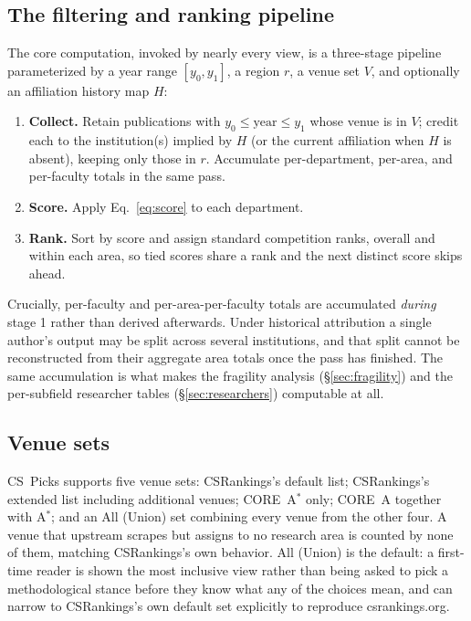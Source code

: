 \documentclass[11pt]{article}
\newcommand{\sys}{CS~Picks}
\newcommand{\csr}{CSRankings}
\begin{document}
\subsection{The filtering and ranking pipeline}

The core computation, invoked by nearly every view, is a three-stage pipeline
parameterized by a year range $[y_0, y_1]$, a region $r$, a venue set $V$, and
optionally an affiliation history map $H$:

\begin{enumerate}
  \item \textbf{Collect.} Retain publications with $y_0 \le \text{year} \le
    y_1$ whose venue is in $V$; credit each to the institution(s) implied by
    $H$ (or the current affiliation when $H$ is absent), keeping only those in
    $r$. Accumulate per-department, per-area, and per-faculty totals in the
    same pass.
  \item \textbf{Score.} Apply Eq.~\ref{eq:score} to each department.
  \item \textbf{Rank.} Sort by score and assign standard competition ranks,
    overall and within each area, so tied scores share a rank and the next
    distinct score skips ahead.
\end{enumerate}

Crucially, per-faculty and per-area-per-faculty totals are accumulated
\emph{during} stage 1 rather than derived afterwards. Under historical
attribution a single author's output may be split across several institutions,
and that split cannot be reconstructed from their aggregate area totals once
the pass has finished. The same accumulation is what makes the fragility
analysis (\S\ref{sec:fragility}) and the per-subfield researcher tables
(\S\ref{sec:researchers}) computable at all.

\subsection{Venue sets}
\label{sec:venuesets}

\sys{} supports five venue sets: \csr{}'s default list; \csr{}'s extended list
including additional venues; CORE~A$^*$ only; CORE~A together with A$^*$; and
an All (Union) set combining every venue from the other four. A venue that
upstream scrapes but assigns to no research area is counted by none of them,
matching \csr{}'s own behavior. All (Union) is the default: a first-time
reader is shown the most inclusive view rather than being asked to pick a
methodological stance before they know what any of the choices mean, and can
narrow to \csr{}'s own default set explicitly to reproduce csrankings.org.
\end{document}
